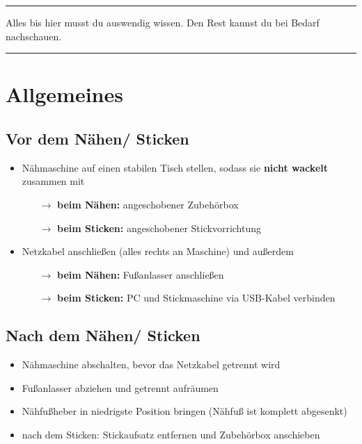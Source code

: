 \documentclass{\basedir/fablab-document}
\newcommand{\pfeil}{\ensuremath{\rightarrow}}
\begin{document}
\vspace{5em}
\hrule

Alles bis hier musst du auswendig wissen. Den Rest kannst du bei Bedarf nachschauen.
\vspace{0.2em}
\hrule
\vspace{3em}

\pagebreak
\section{Allgemeines}

\subsection{Vor dem Nähen/ Sticken}
\begin{itemize}
 \item Nähmaschine auf einen stabilen Tisch stellen, sodass sie \textbf{nicht wackelt} zusammen mit
 \begin{itemize}
 	\item[\pfeil] \textbf{beim Nähen:} angeschobener Zubehörbox
 	\item[\pfeil] \textbf{beim Sticken:} angeschobener Stickvorrichtung
 \end{itemize}
 \item Netzkabel anschließen (alles rechts an Maschine) und außerdem
  \begin{itemize}
 	\item[\pfeil] \textbf{beim Nähen:} Fußanlasser anschließen
 	\item[\pfeil] \textbf{beim Sticken:} PC und Stickmaschine via USB-Kabel verbinden
 \end{itemize}
\end{itemize}

\subsection{Nach dem Nähen/ Sticken}
\begin{itemize}
 \item Nähmaschine abschalten, bevor das Netzkabel getrennt wird
 \item Fußanlasser abziehen und getrennt aufräumen
 \item Nähfußheber in niedrigste Position bringen (Nähfuß ist komplett abgesenkt)
 \item nach dem Sticken: Stickaufsatz entfernen und Zubehörbox anschieben
\end{itemize}
\end{document}
